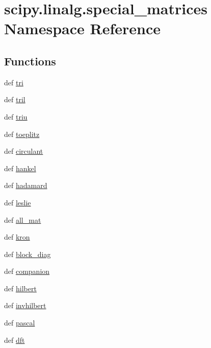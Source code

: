 \hypertarget{namespacescipy_1_1linalg_1_1special__matrices}{}\section{scipy.\+linalg.\+special\+\_\+matrices Namespace Reference}
\label{namespacescipy_1_1linalg_1_1special__matrices}
\subsection*{Functions}
\begin{DoxyCompactItemize}
\item 
def \hyperlink{namespacescipy_1_1linalg_1_1special__matrices_a1d0a7d30030d80e381f63e2ef971a714}{tri}
\item 
def \hyperlink{namespacescipy_1_1linalg_1_1special__matrices_a1c32598aee8dd19083c2d2fdcfb91b71}{tril}
\item 
def \hyperlink{namespacescipy_1_1linalg_1_1special__matrices_a7c95b2593bb820dfe81db87975680ae0}{triu}
\item 
def \hyperlink{namespacescipy_1_1linalg_1_1special__matrices_a956c5dd0f4f826c84ade4f05e5a9ca71}{toeplitz}
\item 
def \hyperlink{namespacescipy_1_1linalg_1_1special__matrices_a089b43b1d83ca2ce9e2d66359839ea42}{circulant}
\item 
def \hyperlink{namespacescipy_1_1linalg_1_1special__matrices_a8d5c66acb8f68f2d4f943bc3ab4b3fc5}{hankel}
\item 
def \hyperlink{namespacescipy_1_1linalg_1_1special__matrices_afd30b1c08c1509ebc07176389ae33eb4}{hadamard}
\item 
def \hyperlink{namespacescipy_1_1linalg_1_1special__matrices_a0a46577eb6a31aec0691067343b05d35}{leslie}
\item 
def \hyperlink{namespacescipy_1_1linalg_1_1special__matrices_af02c3d3dccb03921ed43f6093a12ec21}{all\+\_\+mat}
\item 
def \hyperlink{namespacescipy_1_1linalg_1_1special__matrices_a0eb19a49c2da87e83c87b1e2cb823f79}{kron}
\item 
def \hyperlink{namespacescipy_1_1linalg_1_1special__matrices_a1fc4270663b70fed85d7102b6bdcc4fa}{block\+\_\+diag}
\item 
def \hyperlink{namespacescipy_1_1linalg_1_1special__matrices_a6693e189c145d981aab4905af81304a9}{companion}
\item 
def \hyperlink{namespacescipy_1_1linalg_1_1special__matrices_afb2c714feeb8d0db33ec51890be105db}{hilbert}
\item 
def \hyperlink{namespacescipy_1_1linalg_1_1special__matrices_a4aa7874f9fcfd29ad15ac66a70be2563}{invhilbert}
\item 
def \hyperlink{namespacescipy_1_1linalg_1_1special__matrices_a41e4d88ee3f228d97121c523e9344ad8}{pascal}
\item 
def \hyperlink{namespacescipy_1_1linalg_1_1special__matrices_a2990f8207533d7748b89fbf2373f39d2}{dft}
\end{DoxyCompactItemize}
